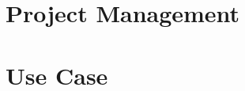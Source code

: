 \documentclass[
	english,%
	authorontitle=true,
	]{bfhbeamer}
\begin{document}

\section{Project Management}

\section{Use Case}
\end{document}
